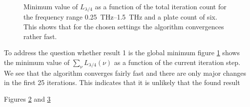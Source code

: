 \begin{figure}[h]
    \centering
    
    \caption{Minimum value of $L_{\lambda/4}$ as a function of the total iteration count for the frequency range \SIrange{0.25}{1.5}{\tera \hertz} and a plate count of six. This shows that for the chosen settings the algorithm convergences rather fast.}
    \label{fig:cl4_convergence}
\end{figure}

To address the question whether result 1 is the global minimum figure  \ref{fig:cl4_convergence} shows the minimum value of $\sum_{\nu}L_{\lambda/4}(\nu)$ as a function of the current iteration step. We see that the algorithm converges fairly fast and there are only major changes in the first 25 iterations. This indicates that it is unlikely that the found result

\begin{figure}[ht]
    \centering
    
    \caption{}
    \label{fig:cl4_pe_lp}
\end{figure}

\begin{figure}[ht]
    \centering
    
    \caption{}
    \label{fig:cl4_pe_cp}
\end{figure}

Figures \ref{fig:cl4_pe_lp} and \ref{fig:cl4_pe_cp} 

\begin{figure}[ht]
    \centering
    
    \caption{}
    \label{fig:cl4_degCirc}
\end{figure}

\begin{figure}[ht]
    \centering
    
    \caption{}
    \label{fig:cl4_degLin}
\end{figure}

\begin{figure}[ht]
    \centering
    
    \caption{}
    \label{fig:cl4_params}
\end{figure}

